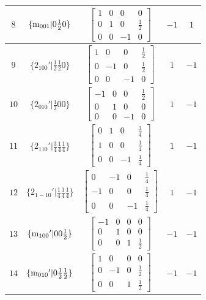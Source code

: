 \documentclass[fleqn,8pt]{jsarticle}
\begin{document}
\begin{longtable}{ccccc}
$ 8 $ & $ \{{\rm m}_{001}|0 \frac{1}{2} 0\} $ & $ \begin{bmatrix} 1 & 0 & 0 & 0 \\ 0 & 1 & 0 & \frac{1}{2} \\ 0 & 0 & -1 & 0 \end{bmatrix} $ & $ -1 $ & $ 1 $ \\ \hline
$ 9 $ & $ \{2{}_{100}{}'|\frac{1}{2} \frac{1}{2} 0\} $ & $ \begin{bmatrix} 1 & 0 & 0 & \frac{1}{2} \\ 0 & -1 & 0 & \frac{1}{2} \\ 0 & 0 & -1 & 0 \end{bmatrix} $ & $ 1 $ & $ -1 $ \\ \hline
$ 10 $ & $ \{2{}_{010}{}'|\frac{1}{2} 0 0\} $ & $ \begin{bmatrix} -1 & 0 & 0 & \frac{1}{2} \\ 0 & 1 & 0 & 0 \\ 0 & 0 & -1 & 0 \end{bmatrix} $ & $ 1 $ & $ -1 $ \\ \hline
$ 11 $ & $ \{2{}_{110}{}'|\frac{3}{4} \frac{1}{4} \frac{1}{4}\} $ & $ \begin{bmatrix} 0 & 1 & 0 & \frac{3}{4} \\ 1 & 0 & 0 & \frac{1}{4} \\ 0 & 0 & -1 & \frac{1}{4} \end{bmatrix} $ & $ 1 $ & $ -1 $ \\ \hline
$ 12 $ & $ \{2{}_{1-10}{}'|\frac{1}{4} \frac{1}{4} \frac{1}{4}\} $ & $ \begin{bmatrix} 0 & -1 & 0 & \frac{1}{4} \\ -1 & 0 & 0 & \frac{1}{4} \\ 0 & 0 & -1 & \frac{1}{4} \end{bmatrix} $ & $ 1 $ & $ -1 $ \\ \hline
$ 13 $ & $ \{{\rm m}_{100}{}'|0 0 \frac{1}{2}\} $ & $ \begin{bmatrix} -1 & 0 & 0 & 0 \\ 0 & 1 & 0 & 0 \\ 0 & 0 & 1 & \frac{1}{2} \end{bmatrix} $ & $ -1 $ & $ -1 $ \\ \hline
$ 14 $ & $ \{{\rm m}_{010}{}'|0 \frac{1}{2} \frac{1}{2}\} $ & $ \begin{bmatrix} 1 & 0 & 0 & 0 \\ 0 & -1 & 0 & \frac{1}{2} \\ 0 & 0 & 1 & \frac{1}{2} \end{bmatrix} $ & $ -1 $ & $ -1 $ \\ \hline

\end{longtable}
\end{document}
